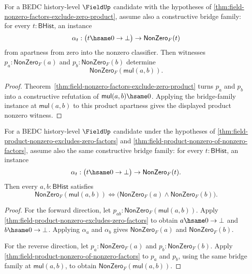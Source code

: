 \begin{theorem}
\label{thm:field-product-nonzero-of-nonzero-factors}
For a BEDC history-level $\FieldUp$ candidate with the hypotheses of
\autoref{thm:field-nonzero-factors-exclude-zero-product}, assume also a
constructive bridge family: for every $t:\mathsf{BHist}$, an instance
$$
\alpha_t:\bigl(t\hsame0\to\bot\bigr)\to\mathsf{NonZero}_F(t)
$$
from apartness from zero into the nonzero classifier. Then witnesses
$p_a:\mathsf{NonZero}_F(a)$ and $p_b:\mathsf{NonZero}_F(b)$ determine
$$
\mathsf{NonZero}_F(\mathsf{mul}(a,b)).
$$
\end{theorem}
\begin{proof}
Theorem~\ref{thm:field-nonzero-factors-exclude-zero-product} turns
$p_a$ and $p_b$ into a constructive refutation of
$\mathsf{mul}(a,b)\hsame0$. Applying the bridge-family instance at
$\mathsf{mul}(a,b)$ to this product apartness gives the displayed product
nonzero witness.
\end{proof}

\begin{theorem}
\label{thm:field-binary-product-nonzero-iff-factors}
For a BEDC history-level $\FieldUp$ candidate under the hypotheses of
\autoref{thm:field-product-nonzero-excludes-zero-factors} and
\autoref{thm:field-product-nonzero-of-nonzero-factors}, assume also the
same constructive bridge family: for every $t:\mathsf{BHist}$, an instance
$$
\alpha_t:\bigl(t\hsame0\to\bot\bigr)\to\mathsf{NonZero}_F(t).
$$
Then every $a,b:\mathsf{BHist}$ satisfies
$$
\mathsf{NonZero}_F(\mathsf{mul}(a,b)) \Longleftrightarrow
\bigl(\mathsf{NonZero}_F(a)\land\mathsf{NonZero}_F(b)\bigr).
$$
\end{theorem}
\begin{proof}
For the forward direction, let
$p_{ab}:\mathsf{NonZero}_F(\mathsf{mul}(a,b))$. Apply
\autoref{thm:field-product-nonzero-excludes-zero-factors} to obtain
$a\hsame0\to\bot$ and $b\hsame0\to\bot$. Applying $\alpha_a$ and
$\alpha_b$ gives $\mathsf{NonZero}_F(a)$ and $\mathsf{NonZero}_F(b)$.

For the reverse direction, let
$p_a:\mathsf{NonZero}_F(a)$ and $p_b:\mathsf{NonZero}_F(b)$. Apply
\autoref{thm:field-product-nonzero-of-nonzero-factors} to $p_a$ and
$p_b$, using the same bridge family at $\mathsf{mul}(a,b)$, to obtain
$\mathsf{NonZero}_F(\mathsf{mul}(a,b))$.
\end{proof}

